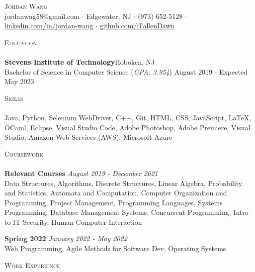 \documentclass[10pt]{article}
\newcommand{\lineunder} {
    \vspace*{-8pt} \\
    \hspace*{-18pt} \hrulefill \\
}
\newcommand{\header} [1] {
    {\hspace*{-18pt}\vspace*{6pt} \textsc{#1}}
    \vspace*{-6pt} \lineunder
}
\begin{document}
\vspace*{-40pt}

    

\vspace*{2pt}
\begin{center}
	{\Huge \scshape {Jordan Wang}}\\
	\vspace{2mm}
	jordanwng58@gmail.com $\cdot$ Edgewater, NJ $\cdot$ (973) 652-5128 $\cdot$ \href{https://www.linkedin.com/in/jordan-wang/}{linkedin.com/in/jordan-wang} $\cdot$ \href{https://github.com/iFallenDawn}{github.com/iFallenDawn} \\
\end{center}
\header{Education}
\textbf{Stevens Institute of Technology}\hfill Hoboken, NJ\\
Bachelor of Science in Computer Science (\textit{GPA: 3.954}) \hfill August 2019 - Expected May 2023\\
\vspace{2mm}

\header{Skills}
	Java, Python, Selenium WebDriver, C++, Git, HTML, CSS, JavaScript, \LaTeX, OCaml, Eclipse, Visual Studio Code, Adobe Photoshop, Adobe Premiere, Visual Studio, Amazon Web Services (AWS), Microsoft Azure                    \\
\vspace{2mm}

\header{Coursework}
{\textbf{Relevant Courses}} {\sl August 2019 - December 2021} \hfill 
\\
Data Structures, Algorithms, Discrete Structures, Linear Algebra, Probability and Statistics, Automata and Computation, Computer Organization and Programming,  Project Management, Programming Languages, Systems Programming, Database Management Systems, Concurrent Programming, Intro to IT Security, Human Computer Interaction\\
\vspace*{2mm}

{\textbf{Spring 2022}} {\sl January 2022 - May 2022} \hfill 
\\
Web Programming, Agile Methods for Software Dev, Operating Systems\\
\vspace*{2mm}

\header{Work Experience}
\vspace{1mm}
\end{document}
